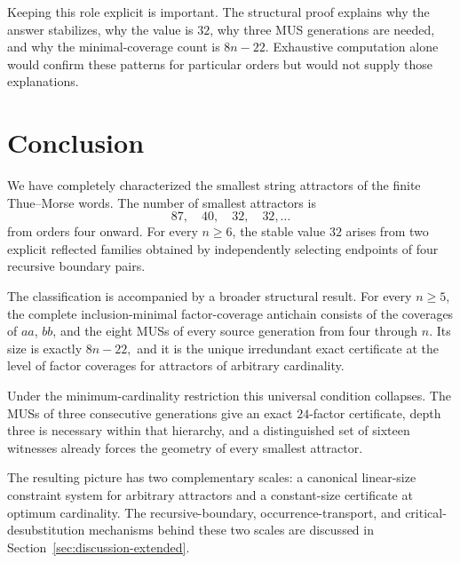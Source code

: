 \documentclass[11pt,a4paper]{article}
\theoremstyle{definition}\newtheorem{definition}[theorem]{Definition}
\theoremstyle{remark}\newtheorem{remark}[theorem]{Remark}
\begin{document}
Keeping this role explicit is important.  The structural proof explains why the answer stabilizes, why the value is $32$, why three MUS generations are needed, and why the minimal-coverage count is $8n-22$.  Exhaustive computation alone would confirm these patterns for particular orders but would not supply those explanations.


\section{Conclusion}
\label{sec:conclusion-extended}

We have completely characterized the smallest string attractors of the finite Thue--Morse words.  The number of smallest attractors is
\[
 87,\quad40,\quad32,\quad32,\ldots
\]
from orders four onward.  For every $n\ge6$, the stable value $32$ arises from two explicit reflected families obtained by independently selecting endpoints of four recursive boundary pairs.

The classification is accompanied by a broader structural result.  For every $n\ge5$, the complete inclusion-minimal factor-coverage antichain consists of the coverages of $aa$, $bb$, and the eight MUSs of every source generation from four through $n$.  Its size is exactly
$
 8n-22,
$
and it is the unique irredundant exact certificate at the level of factor coverages for attractors of arbitrary cardinality.

Under the minimum-cardinality restriction this universal condition collapses.  The MUSs of three consecutive generations give an exact $24$-factor certificate, depth three is necessary within that hierarchy, and a distinguished set of sixteen witnesses already forces the geometry of every smallest attractor.

The resulting picture has two complementary scales: a canonical linear-size constraint system for arbitrary attractors and a constant-size certificate at optimum cardinality.  The recursive-boundary, occurrence-transport, and critical-desubstitution mechanisms behind these two scales are discussed in Section~\ref{sec:discussion-extended}.






\clearpage 

\end{document}
